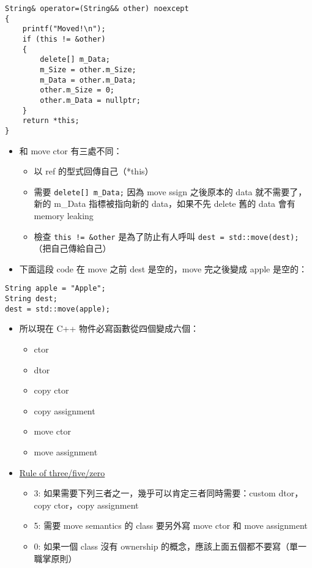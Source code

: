 \documentclass[11pt]{article}
\providecommand{\tightlist}{%
      \setlength{\itemsep}{0pt}\setlength{\parskip}{0pt}}
\begin{document}
\begin{verbatim}
String& operator=(String&& other) noexcept
{
    printf("Moved!\n");
    if (this != &other)
    {
        delete[] m_Data;
        m_Size = other.m_Size;
        m_Data = other.m_Data;
        other.m_Size = 0;
        other.m_Data = nullptr;
    }
    return *this;
}
\end{verbatim}

\begin{itemize}
\tightlist
\item
  和 move ctor 有三處不同：

  \begin{itemize}
  \tightlist
  \item
    以 ref 的型式回傳自己（*this）
  \item
    需要 \texttt{delete{[}{]}\ m\_Data;} 因為 move ssign 之後原本的 data
    就不需要了，新的 m\_Data 指標被指向新的 data，如果不先 delete 舊的
    data 會有 memory leaking
  \item
    檢查 \texttt{this\ !=\ \&other} 是為了防止有人呼叫
    \texttt{dest\ =\ std::move(dest);}（把自己傳給自己）
  \end{itemize}
\item
  下面這段 code 在 move 之前 dest 是空的，move 完之後變成 apple 是空的：
\end{itemize}

\begin{verbatim}
String apple = "Apple";
String dest;
dest = std::move(apple);
\end{verbatim}

\begin{itemize}
\tightlist
\item
  所以現在 C++ 物件必寫函數從四個變成六個：

  \begin{itemize}
  \tightlist
  \item
    ctor
  \item
    dtor
  \item
    copy ctor
  \item
    copy assignment
  \item
    move ctor
  \item
    move assignment
  \end{itemize}
\item
  \href{https://en.cppreference.com/w/cpp/language/rule_of_three}{Rule
  of three/five/zero}

  \begin{itemize}
  \tightlist
  \item
    3: 如果需要下列三者之一，幾乎可以肯定三者同時需要：custom dtor，copy
    ctor，copy assignment
  \item
    5: 需要 move semantics 的 class 要另外寫 move ctor 和 move
    assignment
  \item
    0: 如果一個 class 沒有 ownership
    的概念，應該上面五個都不要寫（單一職掌原則）
  \end{itemize}
\end{itemize}
\end{document}
